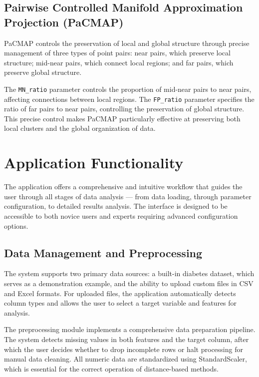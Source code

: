 \documentclass[a4paper, 12pt]{article}
\begin{document}
\subsection{Pairwise Controlled Manifold Approximation Projection (PaCMAP)}

PaCMAP controls the preservation of local and global structure through precise management of three types of point pairs: near pairs, which preserve local structure; mid-near pairs, which connect local regions; and far pairs, which preserve global structure.

The \texttt{MN\_ratio} parameter controls the proportion of mid-near pairs to near pairs, affecting connections between local regions. The \texttt{FP\_ratio} parameter specifies the ratio of far pairs to near pairs, controlling the preservation of global structure. This precise control makes PaCMAP particularly effective at preserving both local clusters and the global organization of data.

\section{Application Functionality}

The application offers a comprehensive and intuitive workflow that guides the user through all stages of data analysis --- from data loading, through parameter configuration, to detailed results analysis. The interface is designed to be accessible to both novice users and experts requiring advanced configuration options.

\subsection{Data Management and Preprocessing}

The system supports two primary data sources: a built-in diabetes dataset, which serves as a demonstration example, and the ability to upload custom files in CSV and Excel formats. For uploaded files, the application automatically detects column types and allows the user to select a target variable and features for analysis.

The preprocessing module implements a comprehensive data preparation pipeline. The system detects missing values in both features and the target column, after which the user decides whether to drop incomplete rows or halt processing for manual data cleaning. All numeric data are standardized using StandardScaler, which is essential for the correct operation of distance-based methods.
\end{document}
